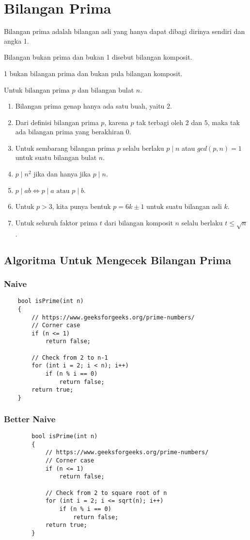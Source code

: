 	\section{Bilangan Prima}
	Bilangan prima adalah bilangan asli yang hanya dapat dibagi dirinya sendiri dan angka 1. 
	    
	 Bilangan bukan prima dan bukan 1 disebut bilangan komposit.
	 
	 1 bukan bilangan prima dan bukan pula bilangan komposit. 
	 
	 Untuk bilangan prima $p$ dan bilangan bulat $n$.
	 \begin{enumerate}
	     \item Bilangan prima genap hanya ada satu buah, yaitu 2.
	     \item Dari definisi bilangan prima $p$, karena $p$ tak terbagi oleh $2$ dan $5$, maka tak ada bilangan prima yang berakhiran $0$.
	     \item Untuk sembarang bilangan prima $p$ selalu berlaku $p \mid n$ atau $gcd(p,n)=1$ untuk suatu bilangan bulat $n$.
	     \item $p \mid n^2$ jika dan hanya jika $p \mid n$.
	     \item $p \mid ab \iff p \mid a \text{ atau } p \mid b$.
	     \item Untuk $p > 3$, kita punya bentuk $p = 6k \pm 1$ untuk suatu bilangan asli $k$.
	     \item Untuk seluruh faktor prima $t$ dari bilangan komposit $n$ selalu berlaku $t \le \sqrt{n}$.
	  \end{enumerate}
	  
	\subsection{Algoritma Untuk Mengecek Bilangan Prima}
	\subsubsection{Naive}
	\begin{lstlisting}
	bool isPrime(int n)
	{
		// https://www.geeksforgeeks.org/prime-numbers/
	    // Corner case
	    if (n <= 1)
	        return false;
	 
	    // Check from 2 to n-1
	    for (int i = 2; i < n); i++)
	        if (n % i == 0)
	            return false;
	    return true;
	}
	\end{lstlisting}
	
	\subsubsection{Better Naive}
	\begin{lstlisting}
		bool isPrime(int n)
		{
			// https://www.geeksforgeeks.org/prime-numbers/
		    // Corner case
		    if (n <= 1)
		        return false;
		 
		    // Check from 2 to square root of n
		    for (int i = 2; i <= sqrt(n); i++)
		        if (n % i == 0)
		            return false;
		    return true;
		}
		\end{lstlisting}
	

